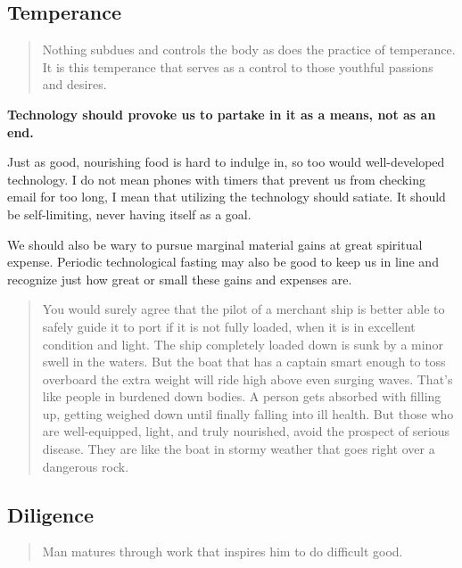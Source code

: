 \documentclass[letterpaper]{article}
\begin{document}
\subsection{Temperance}

\begin{quote}
  Nothing subdues and controls the body as does the practice of temperance. It is this temperance that serves as a control to those youthful passions and desires.
\end{quote}

\textbf{Technology should provoke us to partake in it as a means, not as an end.} 

Just as good, nourishing food is hard to indulge in, so too would well-developed technology. I do not mean phones with timers that prevent us from checking email for too long, I mean that utilizing the technology should satiate. It should be self-limiting, never having itself as a goal.

We should also be wary to pursue marginal material gains at great spiritual expense. Periodic technological fasting may also be good to keep us in line and recognize just how great or small these gains and expenses are.

\begin{quote}
  You would surely agree that the pilot of a merchant ship is better able to safely guide it to port if it is not fully loaded, when it is in excellent condition and light. The ship completely loaded down is sunk by a minor swell in the waters. But the boat that has a captain smart enough to toss overboard the extra weight will ride high above even surging waves.
  That’s like people in burdened down bodies. A person gets absorbed with filling up, getting weighed down until finally falling into ill health. But those who are well-equipped, light, and truly nourished, avoid the prospect of serious disease. They are like the boat in stormy weather that goes right over a dangerous rock.
\end{quote}



\subsection{Diligence}

\begin{quote}
  Man matures through work that inspires him to do difficult good.
\end{quote}
\end{document}
